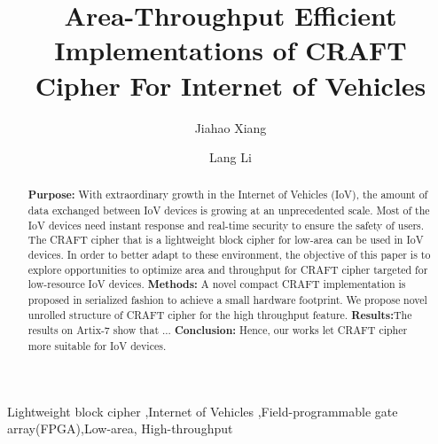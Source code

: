 \documentclass[final,5p,times,twocolumn]{elsarticle}
\begin{document}
\begin{frontmatter}

    \title{Area-Throughput Efficient Implementations of CRAFT Cipher For Internet of Vehicles}

    \author[a,b]{Jiahao Xiang}
    \author[a,b]{Lang Li}






    \begin{abstract}
        \textbf{Purpose:} With extraordinary growth in the Internet of Vehicles (IoV), the amount of data exchanged between IoV devices is growing at an unprecedented scale.
        Most of the IoV devices need instant response and real-time security to ensure the safety of users.
        The CRAFT cipher that is a lightweight block cipher for low-area can be used in IoV devices.
        In order to better adapt to these environment, the objective of this paper is to explore opportunities to optimize area and throughput for CRAFT cipher targeted for low-resource IoV devices.
        \textbf{Methods:} A novel compact CRAFT implementation is proposed in serialized fashion to achieve a small hardware footprint.
        We propose novel unrolled structure of CRAFT cipher for the high throughput feature.
        \textbf{Results:}The results on Artix-7 show that ...
        \textbf{Conclusion:} Hence, our works let CRAFT cipher more suitable for IoV devices.
    \end{abstract}

    \begin{keyword}
        Lightweight block cipher \sep Internet of Vehicles \sep Field-programmable gate array(FPGA)\sep  Low-area, High-throughput

    \end{keyword}

\end{frontmatter}
\end{document}
